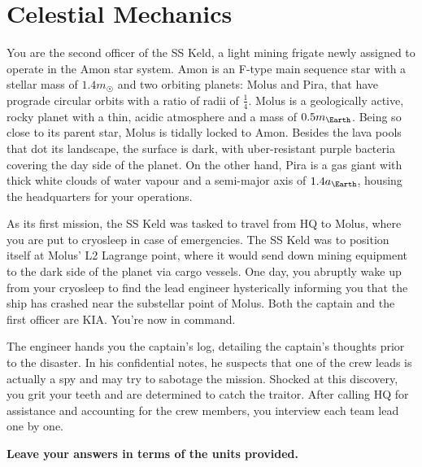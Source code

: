 \documentclass{article}
\begin{document}
\section{Celestial Mechanics}
You are the second officer of the SS Keld, a light mining frigate newly assigned to operate in the Amon star system. Amon is an F-type main sequence star with a stellar mass of $1.4m_\Sun$ and two orbiting planets: Molus and Pira, that have prograde circular orbits with a ratio of radii of $\frac{1}{4}$. Molus is a geologically active, rocky planet with a thin, acidic atmosphere and a mass of $0.5m_\Earth$. Being so close to its parent star, Molus is tidally locked to Amon. Besides the lava pools that dot its landscape, the surface is dark, with uber-resistant purple bacteria covering the day side of the planet. On the other hand, Pira is a gas giant with thick white clouds of water vapour and a semi-major axis of $1.4a_\Earth$, housing the headquarters for your operations.
\par
As its first mission, the SS Keld was tasked to travel from HQ to Molus, where you are put to cryosleep in case of emergencies. The SS Keld was to position itself at Molus’ L2 Lagrange point, where it would send down mining equipment to the dark side of the planet via cargo vessels. One day, you abruptly wake up from your cryosleep to find the lead engineer hysterically informing you that the ship has crashed near the substellar point of Molus. Both the captain and the first officer are KIA. You’re now in command.
\par
The engineer hands you the captain’s log, detailing the captain’s thoughts prior to the disaster. In his confidential notes, he suspects that one of the crew leads is actually a spy and may try to sabotage the mission. Shocked at this discovery, you grit your teeth and are determined to catch the traitor. After calling HQ for assistance and accounting for the crew members, you interview each team lead one by one.
\par
\textbf{Leave your answers in terms of the units provided.}
\end{document}
